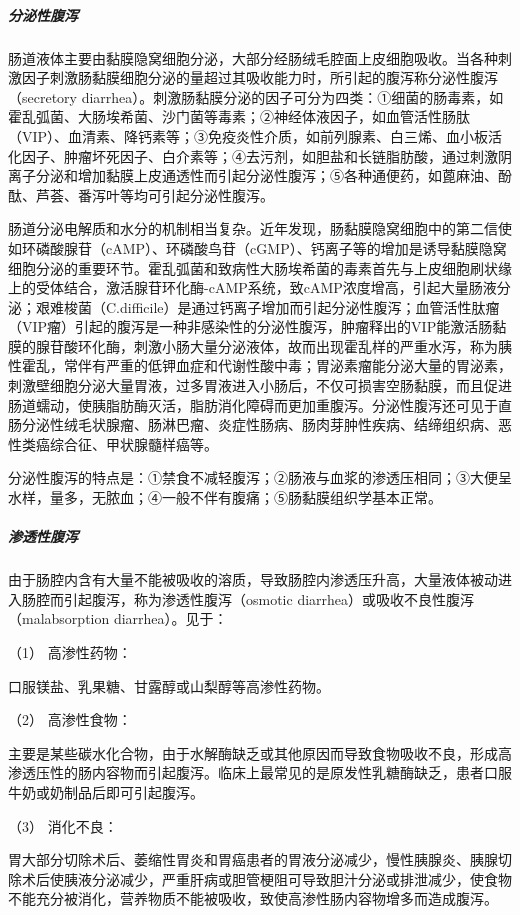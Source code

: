 \subparagraph{分泌性腹泻}

肠道液体主要由黏膜隐窝细胞分泌，大部分经肠绒毛腔面上皮细胞吸收。当各种刺激因子刺激肠黏膜细胞分泌的量超过其吸收能力时，所引起的腹泻称分泌性腹泻（secretory
diarrhea）。刺激肠黏膜分泌的因子可分为四类：①细菌的肠毒素，如霍乱弧菌、大肠埃希菌、沙门菌等毒素；②神经体液因子，如血管活性肠肽（VIP）、血清素、降钙素等；③免疫炎性介质，如前列腺素、白三烯、血小板活化因子、肿瘤坏死因子、白介素等；④去污剂，如胆盐和长链脂肪酸，通过刺激阴离子分泌和增加黏膜上皮通透性而引起分泌性腹泻；⑤各种通便药，如蓖麻油、酚酞、芦荟、番泻叶等均可引起分泌性腹泻。

肠道分泌电解质和水分的机制相当复杂。近年发现，肠黏膜隐窝细胞中的第二信使如环磷酸腺苷（cAMP）、环磷酸鸟苷（cGMP）、钙离子等的增加是诱导黏膜隐窝细胞分泌的重要环节。霍乱弧菌和致病性大肠埃希菌的毒素首先与上皮细胞刷状缘上的受体结合，激活腺苷环化酶-cAMP系统，致cAMP浓度增高，引起大量肠液分泌；艰难梭菌（C.difficile）是通过钙离子增加而引起分泌性腹泻；血管活性肽瘤（VIP瘤）引起的腹泻是一种非感染性的分泌性腹泻，肿瘤释出的VIP能激活肠黏膜的腺苷酸环化酶，刺激小肠大量分泌液体，故而出现霍乱样的严重水泻，称为胰性霍乱，常伴有严重的低钾血症和代谢性酸中毒；胃泌素瘤能分泌大量的胃泌素，刺激壁细胞分泌大量胃液，过多胃液进入小肠后，不仅可损害空肠黏膜，而且促进肠道蠕动，使胰脂肪酶灭活，脂肪消化障碍而更加重腹泻。分泌性腹泻还可见于直肠分泌性绒毛状腺瘤、肠淋巴瘤、炎症性肠病、肠肉芽肿性疾病、结缔组织病、恶性类癌综合征、甲状腺髓样癌等。

分泌性腹泻的特点是：①禁食不减轻腹泻；②肠液与血浆的渗透压相同；③大便呈水样，量多，无脓血；④一般不伴有腹痛；⑤肠黏膜组织学基本正常。

\subparagraph{渗透性腹泻}

由于肠腔内含有大量不能被吸收的溶质，导致肠腔内渗透压升高，大量液体被动进入肠腔而引起腹泻，称为渗透性腹泻（osmotic
diarrhea）或吸收不良性腹泻（malabsorption diarrhea）。见于：

\hypertarget{text00030.htmlux5cux23CHP1-12-1-2-1}{}
（1） 高渗性药物：

口服镁盐、乳果糖、甘露醇或山梨醇等高渗性药物。

\hypertarget{text00030.htmlux5cux23CHP1-12-1-2-2}{}
（2） 高渗性食物：

主要是某些碳水化合物，由于水解酶缺乏或其他原因而导致食物吸收不良，形成高渗透压性的肠内容物而引起腹泻。临床上最常见的是原发性乳糖酶缺乏，患者口服牛奶或奶制品后即可引起腹泻。

\hypertarget{text00030.htmlux5cux23CHP1-12-1-2-3}{}
（3） 消化不良：

胃大部分切除术后、萎缩性胃炎和胃癌患者的胃液分泌减少，慢性胰腺炎、胰腺切除术后使胰液分泌减少，严重肝病或胆管梗阻可导致胆汁分泌或排泄减少，使食物不能充分被消化，营养物质不能被吸收，致使高渗性肠内容物增多而造成腹泻。

